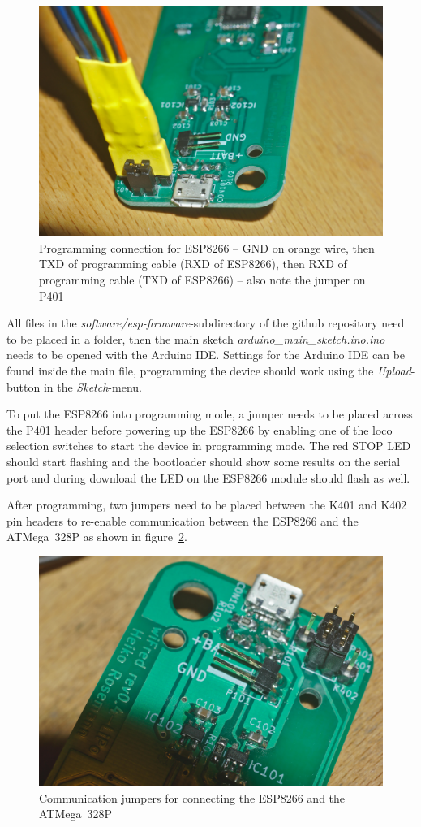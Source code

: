 \documentclass[11pt,a4paper]{scrartcl}
\begin{document}
\begin{figure}[tbhp]
  \centering
  \includegraphics[width=0.8 \textwidth]{images/_DSC0138}
  \caption{Programming connection for ESP8266 -- GND on orange wire, then TXD of programming cable (RXD of ESP8266), then RXD of programming cable (TXD of ESP8266) -- also note the jumper on P401}
  \label{progESP}
\end{figure}

All files in the \textit{software/esp-firmware}-subdirectory of the github repository need to be placed in a folder, then the main sketch \textit{arduino\_main\_sketch.ino.ino} needs to be opened with the Arduino IDE. Settings for the Arduino IDE can be found inside the main file, programming the device should work using the \textit{Upload}-button in the \textit{Sketch}-menu.

To put the ESP8266 into programming mode, a jumper needs to be placed across the P401 header before powering up the ESP8266 by enabling one of the loco selection switches to start the device in programming mode. The red STOP LED should start flashing and the bootloader should show some results on the serial port and during download the LED on the ESP8266 module should flash as well.

After programming, two jumpers need to be placed between the K401 and K402 pin headers to re-enable communication between the ESP8266 and the ATMega~328P as shown in figure~\ref{serialJumpers}.

\begin{figure}[tbhp]
  \centering
  \includegraphics[width=0.8 \textwidth]{images/_DSC0149}
  \caption{Communication jumpers for connecting the ESP8266 and the ATMega~328P}
  \label{serialJumpers}
\end{figure}
\end{document}
